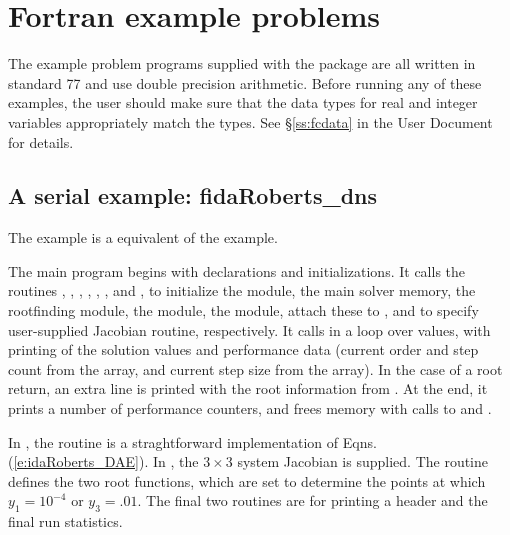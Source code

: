 \section{Fortran example problems}\label{s:ex_fortran}

The {\F} example problem programs supplied with the {\ida}
package are all written in standard {\F}77 and use double precision
arithmetic.  Before running any of these examples, the user should
make sure that the {\F} data types for real and integer variables
appropriately match the {\CC} types.  See \S\ref{ss:fcdata} in the
{\ida} User Document for details.

\subsection{A serial example: fidaRoberts\_dns}\label{ss:fidaRoberts}

The  example is a {\F} equivalent of the
 example.

The main program begins with declarations and initializations.  
It calls the routines , , , 
, , , and
, to initialize the {\nvecs} module, the main
solver memory, the rootfinding module, the {\sunmatdense} module, the
{\sunlinsoldense} module, attach these to {\ida}, and to specify
user-supplied Jacobian routine, respectively. 
It calls  in a loop over  values, with printing of
the solution values and performance data (current order and step count
from the  array, and current step size from the  array).
In the case of a root return, an extra line is printed with the root
information from .  At the end, it prints a number of
performance counters, and frees memory with calls to 
and .

In , the  routine is a straghtforward
implementation of Eqns. (\ref{e:idaRoberts_DAE}).  In , the 
$3 \times 3$ system Jacobian is supplied.  The  routine
defines the two root functions, which are set to determine the points at which
$y_1 = 10^{-4}$ or $y_3 = .01$.  The final two routines are for
printing a header and the final run statistics.


